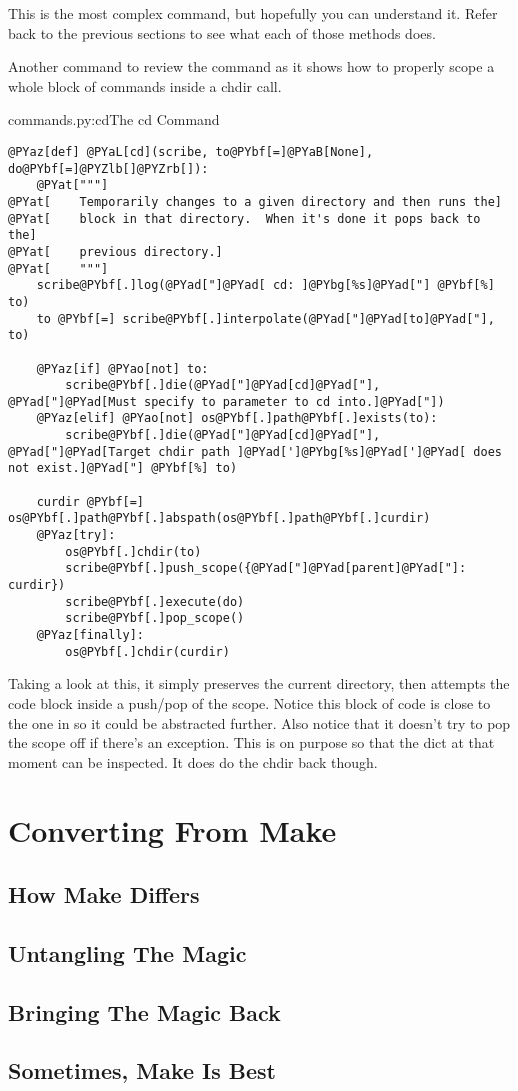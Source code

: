 This is the most complex command, but hopefully you can understand it.  Refer
back to the previous sections to see what each of those methods does.

Another command to review the  command as it shows how to properly
scope a whole block of commands inside a chdir call.


\begin{code}{commands.py:cd}{The cd Command}
\begin{Verbatim}[commandchars=@\[\]]
@PYaz[def] @PYaL[cd](scribe, to@PYbf[=]@PYaB[None], do@PYbf[=]@PYZlb[]@PYZrb[]):
    @PYat["""]
@PYat[    Temporarily changes to a given directory and then runs the]
@PYat[    block in that directory.  When it's done it pops back to the]
@PYat[    previous directory.]
@PYat[    """]
    scribe@PYbf[.]log(@PYad["]@PYad[ cd: ]@PYbg[%s]@PYad["] @PYbf[%] to)
    to @PYbf[=] scribe@PYbf[.]interpolate(@PYad["]@PYad[to]@PYad["], to)

    @PYaz[if] @PYao[not] to: 
        scribe@PYbf[.]die(@PYad["]@PYad[cd]@PYad["], @PYad["]@PYad[Must specify to parameter to cd into.]@PYad["])
    @PYaz[elif] @PYao[not] os@PYbf[.]path@PYbf[.]exists(to):
        scribe@PYbf[.]die(@PYad["]@PYad[cd]@PYad["], @PYad["]@PYad[Target chdir path ]@PYad[']@PYbg[%s]@PYad[']@PYad[ does not exist.]@PYad["] @PYbf[%] to)

    curdir @PYbf[=] os@PYbf[.]path@PYbf[.]abspath(os@PYbf[.]path@PYbf[.]curdir)
    @PYaz[try]:
        os@PYbf[.]chdir(to)
        scribe@PYbf[.]push_scope({@PYad["]@PYad[parent]@PYad["]: curdir})
        scribe@PYbf[.]execute(do)
        scribe@PYbf[.]pop_scope()
    @PYaz[finally]:
        os@PYbf[.]chdir(curdir)
\end{Verbatim}

\end{code}

Taking a look at this, it simply preserves the current directory, then attempts
the code block inside a push/pop of the scope.  Notice this block of code is
close to the one in  so it could be abstracted further.  Also
notice that it doesn't try to pop the scope off if there's an exception.  This
is on purpose so that the  dict at that moment can be inspected.
It does do the chdir back though.


\chapter{Converting From Make}
\label{chapter:Converting}



\section{How Make Differs}


\section{Untangling The Magic}


\section{Bringing The Magic Back}


\section{Sometimes, Make Is Best}




